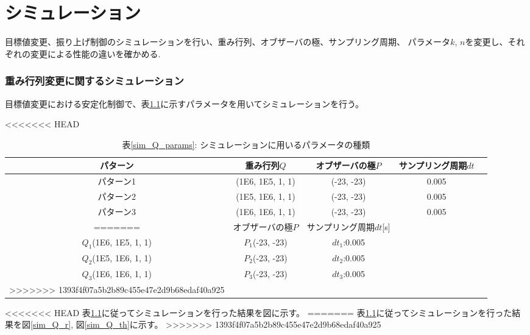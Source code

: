 \chapter{シミュレーション}
目標値変更、振り上げ制御のシミュレーションを行い、重み行列、オブザーバの極、サンプリング周期、
パラメータ$k$, $n$を変更し、それぞれの変更による性能の違いを確かめる.

\subsection{重み行列変更に関するシミュレーション}
目標値変更における安定化制御で、表\ref{sim_Q}に示すパラメータを用いてシミュレーションを行う。

\begin{table}[htbp]
    \begin{center}
<<<<<<< HEAD
        \caption{表\ref{sim_Q}: シミュレーションに用いるパラメータの種類}
        \begin{tabular}{|c|c|c|c|c|} \hline
            パターン & 重み行列$Q$ & オブザーバの極$P$ & サンプリング周期$dt$ \\ \hline \hline
            パターン1 & (1E6, 1E5, 1, 1) & (-23, -23) & 0.005 \\ \hline
            パターン2 & (1E5, 1E6, 1, 1) & (-23, -23) & 0.005 \\ \hline
            パターン3 & (1E6, 1E6, 1, 1) & (-23, -23) & 0.005 \\ \hline
=======
        \caption{表\ref{sim_Q_params}: シミュレーションに用いるパラメータの種類}
        \begin{tabular}{|c|c|c|c|} \hline
            重み行列$Q$ & オブザーバの極$P$ & サンプリング周期$dt$[s] \\ \hline \hline
            $Q_1$(1E6, 1E5, 1, 1) & $P_1$(-23, -23) & $dt_1$:0.005 \\ \hline
            $Q_2$(1E5, 1E6, 1, 1) & $P_2$(-23, -23) & $dt_2$:0.005 \\ \hline
            $Q_3$(1E6, 1E6, 1, 1) & $P_3$(-23, -23) & $dt_3$:0.005 \\ \hline
>>>>>>> 1393f4f07a5b2b89c455e47e2d9b68edaf40a925
        \end{tabular}
        \label{sim_Q}
    \end{center}
\end{table}

<<<<<<< HEAD
表\ref{sim_Q}に従ってシミュレーションを行った結果を図に示す。
=======
表\ref{sim_Q}に従ってシミュレーションを行った結果を図\ref{sim_Q_r}, 図\ref{sim_Q_th}に示す。
>>>>>>> 1393f4f07a5b2b89c455e47e2d9b68edaf40a925

